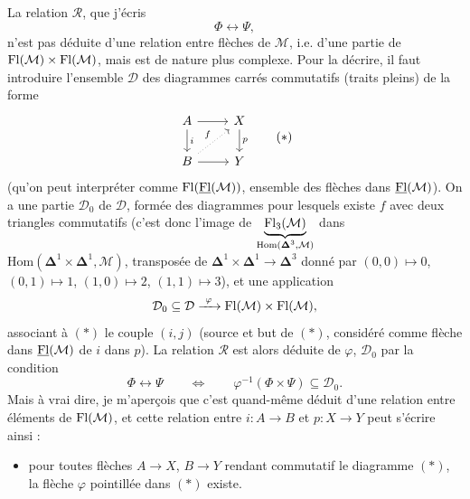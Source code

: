 \begin{itemize}[leftmargin=2.5em]
La relation $\mathcal{R}$, que j'écris
\[
\Phi\longleftrightarrow\Psi,
\]
n'est pas déduite d'une relation entre flèches de $\mathcal{M}$, i.e. d'une partie de $\mathrm{Fl}(\mathcal{M})\times\mathrm{Fl}(\mathcal{M})$, mais est de nature plus complexe. Pour la décrire, il faut introduire l'ensemble $\mathcal{D}$ des diagrammes carrés commutatifs (traits pleins) de la forme
\[
\begin{tikzcd}
A \arrow[r] \arrow[d, "i"] & X \arrow[d, "p"] \\
B \arrow[r] \arrow[ur, dotted, "f"] & Y
\end{tikzcd}
\tag*{$(*)$}
\]
(qu'on peut interpréter comme $\mathrm{Fl}(\underline{\mathrm{Fl}}(\mathcal{M}))$, ensemble des flèches dans $\underline{\mathrm{Fl}}(\mathcal{M})$). On a une partie $\mathcal{D}_0$ de $\mathcal{D}$, formée des diagrammes pour lesquels existe $f$ avec deux triangles commutatifs (c'est donc l'image de $\underbrace{\mathrm{Fl}_3(\mathcal{M})}_{\mathrm{Hom}(\boldsymbol{\Delta}^3,\mathcal{M})}$ dans $\mathrm{Hom}(\boldsymbol{\Delta}^1\times\boldsymbol{\Delta}^1,\mathcal{M})$, transposée de $\boldsymbol{\Delta}^1\times\boldsymbol{\Delta}^1\longrightarrow\boldsymbol{\Delta}^3$ donné par $(0,0)\longmapsto 0$, $(0,1)\longmapsto 1$, $(1,0)\longmapsto 2$, $(1,1)\longmapsto 3$), et une application
\[
\mathcal{D}_0\subseteq\mathcal{D}\xrightarrow{\ \varphi\ }\Fl(\mathcal{M})\times\Fl(\mathcal{M}),
\]
associant à $(*)$ le couple $(i,j)$ (source et but de $(*)$, considéré comme flèche dans $\underline{\mathrm{Fl}}(\mathcal{M})$ de $i$ dans $p$). La relation $\mathcal{R}$ est alors déduite de $\varphi$, $\mathcal{D}_0$ par la condition
\[
\Phi\longleftrightarrow\Psi\qquad\Longleftrightarrow\qquad\varphi^{-1}(\Phi\times\Psi)\subseteq\mathcal{D}_0.
\]
Mais à vrai dire, je m'aperçois que c'est quand-même déduit d'une relation entre éléments de $\mathrm{Fl}(\mathcal{M})$, et cette relation entre $i : A\longrightarrow B$ et $p : X\longrightarrow Y$ peut s'écrire ainsi :
\begin{itemize}[leftmargin=3em]
\item[$(**)$] pour toutes flèches $A\longrightarrow X$, $B\longrightarrow Y$ rendant commutatif le diagramme $(*)$, la flèche $\varphi$ pointillée dans $(*)$ existe. %
\end{itemize}
\end{itemize}

